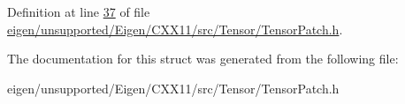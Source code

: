 Definition at line \hyperlink{eigen_2unsupported_2_eigen_2_c_x_x11_2src_2_tensor_2_tensor_patch_8h_source_l00037}{37} of file \hyperlink{eigen_2unsupported_2_eigen_2_c_x_x11_2src_2_tensor_2_tensor_patch_8h_source}{eigen/unsupported/\+Eigen/\+C\+X\+X11/src/\+Tensor/\+Tensor\+Patch.\+h}.



The documentation for this struct was generated from the following file\+:\begin{DoxyCompactItemize}
\item 
eigen/unsupported/\+Eigen/\+C\+X\+X11/src/\+Tensor/\+Tensor\+Patch.\+h\end{DoxyCompactItemize}

